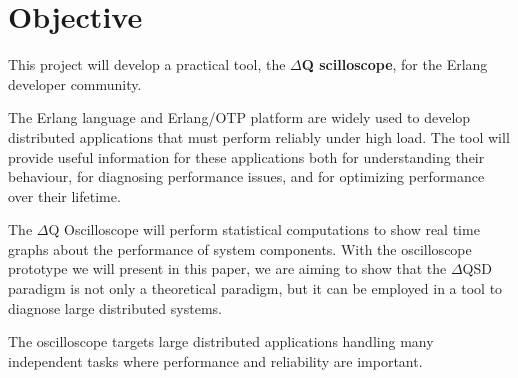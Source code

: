 \section{Objective}
         This project will develop a practical tool, the \textbf{$\Delta$Q scilloscope}, for the Erlang developer community. 
    
    The Erlang language and Erlang/OTP platform are widely used to develop distributed applications that must perform reliably under high load. The tool will provide useful information for these applications both for understanding their behaviour, for diagnosing performance issues, and for optimizing performance over their lifetime. 

    The $\Delta$Q Oscilloscope will perform statistical computations to show real time graphs about the performance of system components. With the oscilloscope prototype we will present in this paper, we are aiming to show that the $\Delta$QSD paradigm is not only a theoretical paradigm, but it can be employed in a tool to diagnose large distributed systems.  
 
    The oscilloscope targets large distributed applications handling many independent tasks where performance and reliability are important. 
    

